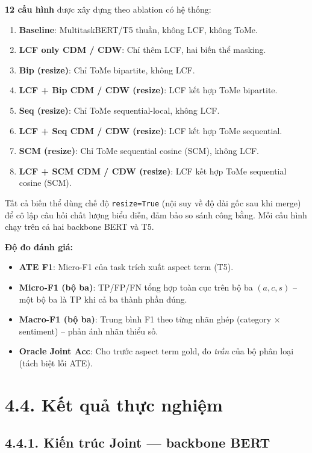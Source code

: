 \textbf{12 cấu hình} được xây dựng theo ablation có hệ thống:

\begin{enumerate}
  \item \textbf{Baseline}: MultitaskBERT/T5 thuần, không LCF, không ToMe.
  \item \textbf{LCF only CDM / CDW}: Chỉ thêm LCF, hai biến thể masking.
  \item \textbf{Bip (resize)}: Chỉ ToMe bipartite, không LCF.
  \item \textbf{LCF + Bip CDM / CDW (resize)}: LCF kết hợp ToMe bipartite.
  \item \textbf{Seq (resize)}: Chỉ ToMe sequential-local, không LCF.
  \item \textbf{LCF + Seq CDM / CDW (resize)}: LCF kết hợp ToMe sequential.
  \item \textbf{SCM (resize)}: Chỉ ToMe sequential cosine (SCM), không LCF.
  \item \textbf{LCF + SCM CDM / CDW (resize)}: LCF kết hợp ToMe
        sequential cosine (SCM).
\end{enumerate}

Tất cả biến thể dùng chế độ \texttt{resize=True} (nội suy về độ dài
gốc sau khi merge) để cô lập câu hỏi chất lượng biểu diễn, đảm bảo
so sánh công bằng. Mỗi cấu hình chạy trên cả hai backbone BERT và T5.

\textbf{Độ đo đánh giá:}
\begin{itemize}
  \item \textbf{ATE F1}: Micro-F1 của task trích xuất aspect term (T5).
  \item \textbf{Micro-F1 (bộ ba)}: TP/FP/FN tổng hợp toàn cục trên
        bộ ba $(a, c, s)$ -- một bộ ba là TP khi cả ba thành phần đúng.
  \item \textbf{Macro-F1 (bộ ba)}: Trung bình F1 theo từng nhãn ghép
        (category $\times$ sentiment) -- phản ánh nhãn thiểu số.
  \item \textbf{Oracle Joint Acc}: Cho trước aspect term gold, đo
        \emph{trần} của bộ phân loại (tách biệt lỗi ATE).
\end{itemize}

\section{4.4.\; Kết quả thực nghiệm}
\label{sec:results}

\subsection{4.4.1.\; Kiến trúc Joint — backbone BERT}

